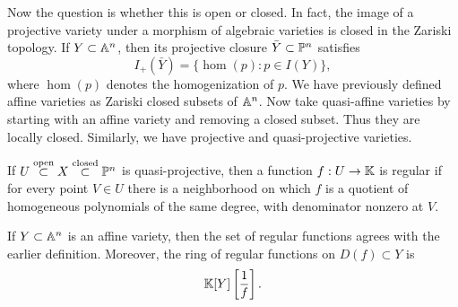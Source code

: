 \begin{figure}[H]
    \centering


    \colorbox{white}{%
        \color{black}
    }
\end{figure}

Now the question is whether this is open or closed.
In fact, the image of a projective variety under a morphism of algebraic varieties is closed in the Zariski topology.
If $Y\subset \aa^n$, then its projective closure $\bar{Y}\subset \pp^n$ satisfies
\[
    I_+(\bar{Y}) = \{\hom(p) : p\in I(Y)\},
\]
where $\hom(p)$ denotes the homogenization of $p$.
We have previously defined affine varieties as Zariski closed subsets of $\aa^n$.
Now take quasi-affine varieties by starting with an affine variety and removing a closed subset.
Thus they are locally closed.
Similarly, we have projective and quasi-projective varieties.

\begin{lemma*}{
    If $U\overset{\text{open}}{\subset} X\overset{\text{closed}}{\subset} \pp^n$ is quasi-projective, then a function $f:U\to \kk$ is regular if for every point $V\in U$ there is a neighborhood on which $f$ is a quotient of homogeneous polynomials of the same degree, with denominator nonzero at $V$.
}
\end{lemma*}

\begin{lemma*}{
    If $Y\subset \aa^n$ is an affine variety, then the set of regular functions agrees with the earlier definition.
    Moreover, the ring of regular functions on $D(f)\subset Y$ is
    \[
        \kk[Y]\left[\frac{1}{f}\right].
    \]
}
\end{lemma*}

